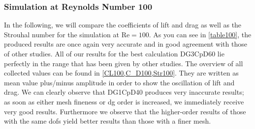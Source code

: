 	\subsubsection{Simulation at Reynolds Number 100}
	In the following, we will compare the coefficients of lift and drag as well as the Strouhal number for the simulation at $\text{Re}=100$. As you can see in \cref{table100}, the produced results are once again very accurate and in good agreement with those of other studies. All of our results for the best calculation DG3CpD60 lie perfectly in the range that has been given by other studies.  The overview of all collected values can be found in \cref{CL100,C_D100,Str100}. They are written as mean value plus/minus amplitude in order to show the oscillation of lift and drag. We can clearly observe that DG1CpD40 produces very inaccurate results; as soon as either mesh fineness or \gls{dg} order is increased, we immediately receive very good results. Furthermore we observe that the higher-order results of those with the same \glspl{dof} yield better results than those with a finer mesh.
